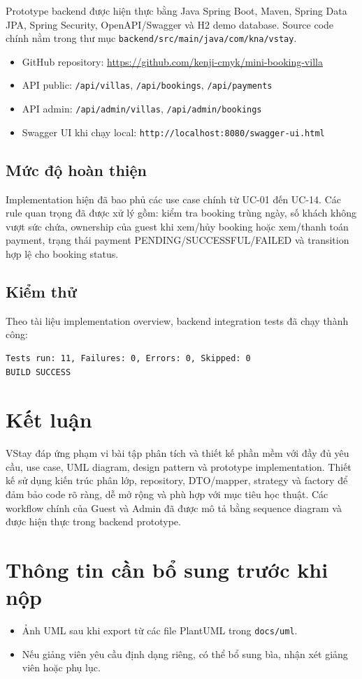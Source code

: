\documentclass[12pt,a4paper]{article}
\begin{document}
Prototype backend được hiện thực bằng Java Spring Boot, Maven, Spring Data JPA, Spring Security, OpenAPI/Swagger và H2 demo database. Source code chính nằm trong thư mục \texttt{backend/src/main/java/com/kna/vstay}.

\begin{itemize}[noitemsep]
  \item GitHub repository: \href{https://github.com/kenji-cmyk/mini-booking-villa}{https://github.com/kenji-cmyk/mini-booking-villa}
  \item API public: \texttt{/api/villas}, \texttt{/api/bookings}, \texttt{/api/payments}
  \item API admin: \texttt{/api/admin/villas}, \texttt{/api/admin/bookings}
  \item Swagger UI khi chạy local: \texttt{http://localhost:8080/swagger-ui.html}
\end{itemize}

\subsection{Mức độ hoàn thiện}

Implementation hiện đã bao phủ các use case chính từ UC-01 đến UC-14. Các rule quan trọng đã được xử lý gồm: kiểm tra booking trùng ngày, số khách không vượt sức chứa, ownership của guest khi xem/hủy booking hoặc xem/thanh toán payment, trạng thái payment PENDING/SUCCESSFUL/FAILED và transition hợp lệ cho booking status.

\subsection{Kiểm thử}

Theo tài liệu implementation overview, backend integration tests đã chạy thành công:

\begin{lstlisting}
Tests run: 11, Failures: 0, Errors: 0, Skipped: 0
BUILD SUCCESS
\end{lstlisting}

\section{Kết luận}

VStay đáp ứng phạm vi bài tập phân tích và thiết kế phần mềm với đầy đủ yêu cầu, use case, UML diagram, design pattern và prototype implementation. Thiết kế sử dụng kiến trúc phân lớp, repository, DTO/mapper, strategy và factory để đảm bảo code rõ ràng, dễ mở rộng và phù hợp với mục tiêu học thuật. Các workflow chính của Guest và Admin đã được mô tả bằng sequence diagram và được hiện thực trong backend prototype.

\section*{Thông tin cần bổ sung trước khi nộp}

\begin{itemize}[noitemsep]
  \item Ảnh UML sau khi export từ các file PlantUML trong \texttt{docs/uml}.
  \item Nếu giảng viên yêu cầu định dạng riêng, có thể bổ sung bìa, nhận xét giảng viên hoặc phụ lục.
\end{itemize}
\end{document}

